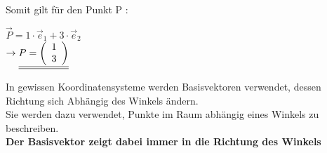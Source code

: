 Somit gilt für den Punkt P : \\
\begin{center}

	$\vec{P} = 1\cdot \vec{e}_1 + 3 \cdot \vec{e}_2$ \\
	$\rightarrow \underline{\underline{ P = \left ( \begin{array}{c} 1 \\ 3 \end{array}\right)}}$
\end{center}
\iend


\beginip
In gewissen Koordinatensysteme werden Basisvektoren verwendet, dessen Richtung sich Abhängig  des Winkels ändern. \\
Sie werden dazu verwendet, Punkte im Raum abhängig eines Winkels zu beschreiben. \\
\textbf{Der Basisvektor zeigt dabei immer in die Richtung des Winkels}
\iend

\newpage

